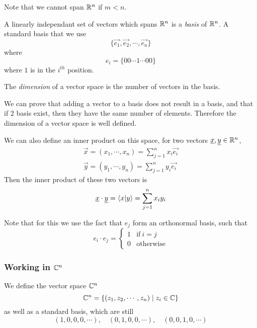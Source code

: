 \documentclass{article}
\numberwithin{equation}{section}
\begin{document}
\begin{remark}
    Note that we cannot span $\R^n$ if $m < n$.
\end{remark}

\begin{defi}[Basis in $\R^n$]
    A linearly independant set of vectors which spans $\R^n$ is a \emph{basis} of $\R^n$. A standard basis that we use
    \[
        \{\vec{e_1}, \vec{e_2}, \cdots, \vec{e_n}\}
    \]
    where
    \[
        e_i = \{00 \cdots 1 \cdots 00\}    
    \]
    where $1$ is in the $i^{th}$ position.
\end{defi}

\begin{defi}[Dimension]
    The \emph{dimension} of a vector space is the number of vectors in the basis.
\end{defi}

\begin{remark}
    We can prove that adding a vector to a basis does not result in a basis, and that if 2 basis exist, then they have the same number of elements. Therefore the dimension of a vector space is well defined.
\end{remark}

We can also define an inner product on this space, for two vectors $\underline{x}, \underline{y} \in \mathbb{R}^n$,
\begin{align*}
    \vec{x} = (x_1, \cdots, x_n) = \sum_{j=1}^{n}{x_i \vec{e_i}} \\
    \vec{y} = (y_1, \cdots, y_n) = \sum_{j=1}^{n}{y_i \vec{e_i}}
\end{align*}
Then the inner product of these two vectors is
\begin{equation}
    \underline{x} \cdot \underline{y} = \left\langle x\middle\vert y \right\rangle = \sum_{j=1}^{n}{x_iy_i}
\end{equation}

Note that for this we use the fact that $e_j$ form an orthonormal basis, such that
\[
    e_i \cdot e_j = \begin{cases}
        1 & \text{if} \ i = j \\
        0 & \text{otherwise}
    \end{cases}
\]

\subsubsection*{Working in $\mathbb{C}^n$}

We define the vector space $\mathbb{C}^n$
\[
    \mathbb{C}^n = \{(z_1, z_2, \cdots, z_n) \mid z_i \in \mathbb{C}\}  
\]
as well as a standard basis, which are still
\[
    (1, 0, 0, 0, \cdots), \quad (0, 1, 0, 0, \cdots), \quad (0, 0, 1, 0, \cdots)
\]
\end{document}
